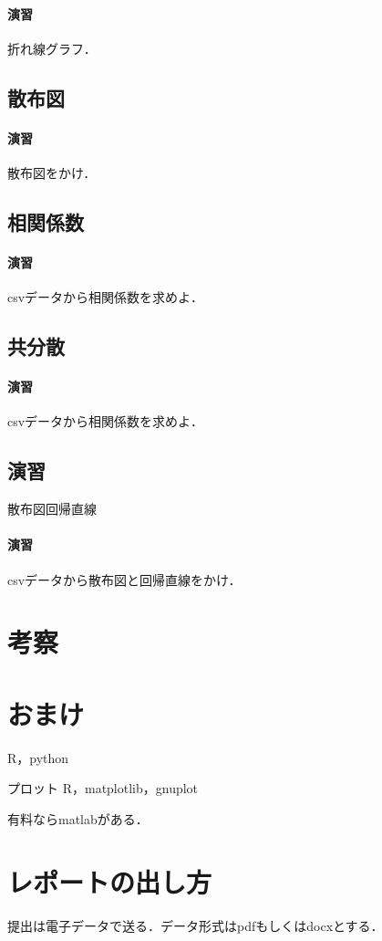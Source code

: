 \documentclass[12pt, a4j]{jreport}
\begin{document}
\paragraph{演習}
折れ線グラフ．



\subsection{散布図}

\paragraph{演習}
散布図をかけ．


\subsection{相関係数}

\paragraph{演習}
csvデータから相関係数を求めよ．

\subsection{共分散}

\paragraph{演習}
csvデータから相関係数を求めよ．

\subsection{演習}
散布図回帰直線

\paragraph{演習}

csvデータから散布図と回帰直線をかけ．


\section{考察}




\section{おまけ}
R，python

プロット
R，matplotlib，gnuplot


有料ならmatlabがある．

\section{レポートの出し方}

提出は電子データで送る．データ形式はpdfもしくはdocxとする．
\end{document}
